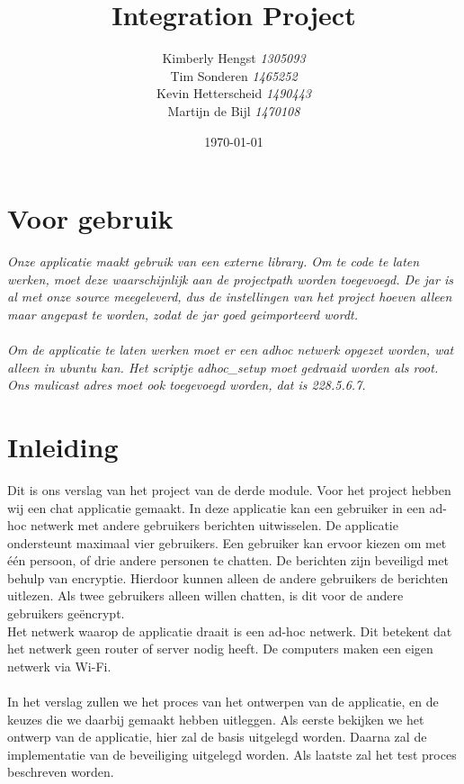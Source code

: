 \documentclass{article}
\title{Integration Project}
\author{Kimberly Hengst \emph{1305093}\\ Tim Sonderen \emph{1465252}\\ Kevin Hetterscheid \emph{1490443}\\ Martijn de Bijl \emph{1470108}}
\date{\today}
\begin{document}
\maketitle

\newpage

\section*{Voor gebruik}
\emph{Onze applicatie maakt gebruik van een externe library. Om te code te laten werken, moet deze waarschijnlijk aan de projectpath worden toegevoegd. De jar is al met onze source meegeleverd, dus de instellingen van het project hoeven alleen maar angepast te worden, zodat de jar goed geimporteerd wordt.\\
\phantom{YOLO} \\
Om de applicatie te laten werken moet er een adhoc netwerk opgezet worden, wat alleen in ubuntu kan. Het scriptje adhoc\_setup moet gedraaid worden als root. Ons mulicast adres moet ook toegevoegd worden, dat is 228.5.6.7. }

\newpage

\tableofcontents

\section{Inleiding}
Dit is ons verslag van het project van de derde module. Voor het project hebben wij een chat applicatie gemaakt. In deze applicatie kan een gebruiker in een ad-hoc netwerk met andere gebruikers berichten uitwisselen. De applicatie ondersteunt maximaal vier gebruikers. Een gebruiker kan ervoor kiezen om met \'{e}\'{e}n persoon, of drie andere personen te chatten. De berichten zijn beveiligd met behulp van encryptie. Hierdoor kunnen alleen de andere gebruikers de berichten uitlezen. Als twee gebruikers alleen willen chatten, is dit voor de andere gebruikers ge\"{e}ncrypt.\\
Het netwerk waarop de applicatie draait is een ad-hoc netwerk. Dit betekent dat het netwerk geen router of server nodig heeft. De computers  maken een eigen netwerk via Wi-Fi.
\\
\phantom{YOLO} \\
In het verslag zullen we het proces van het ontwerpen van de applicatie, en de keuzes die we daarbij gemaakt hebben uitleggen. Als eerste bekijken we het ontwerp van de applicatie, hier zal de basis uitgelegd worden. Daarna zal de implementatie van de beveiliging uitgelegd worden. Als laatste zal het test proces beschreven worden.
\end{document}
